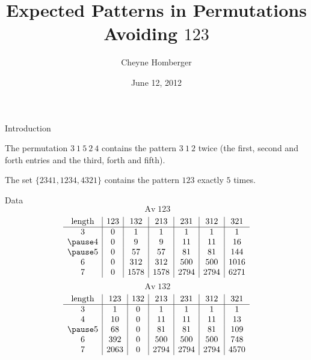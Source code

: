 \documentclass[xcolor=dvipsnames]{beamer}
\DeclareMathOperator{\Av}{Av}
\theoremstyle{definition}            %
\begin{document}
\title{Expected Patterns in Permutations Avoiding $123$}
\author{Cheyne Homberger}
\date{June 12, 2012}

\begin{frame}
  \maketitle
\end{frame}

\begin{frame}{Introduction}
  \pause 

  \begin{example}
    The permutation $3 \ 1 \ 5 \ 2 \ 4$ contains the
    pattern $3 \ 1 \ 2$ twice (the first, second and forth entries and
    the third, forth and fifth).
  \end{example}
  \pause

  \begin{example}
    The set $\{ 2341 , 1234, 4321 \} $ contains the pattern $123$
    exactly $5$ times. 
  \end{example}
\end{frame}


\begin{frame}{Data}
  \pause
  \vspace{-1pc}
  $$\Av 123 $$
  $$\begin{array}{c|c|c|c|c|c|c}
      \text{length} & 123 & 132 & 213 & 231
      & 312 & 321 \\
      \hline
      3  & 0     &    1  &    1 &    1 &    1 &    1  \\
      \pause
      4  & 0     &    9  &    9 &   11 &   11 &   16  \\
      \pause
      5  & 0     &    57 &   57 &   81 &   81 &  144  \\
      6  & 0     &   312 &  312 &  500 &  500 & 1016  \\ 
      7  & 0     &  1578 & 1578 & 2794 & 2794 & 6271   
    \end{array}
  $$
  \pause
  $$ \Av 132 $$
  $$\begin{array}{c|c|c|c|c|c|c}
      \text{length} & 123 & 132 & 213 & 231
      & 312 & 321 \\
      \hline
     3  & 1     &    0  &    1 &    1 &    1 &    1  \\
     4  & 10    &    0  &   11 &   11 &   11 &   13  \\
     \pause
     5  & 68    &    0  &   81 &   81 &   81 &  109  \\
     6  & 392   &    0  &  500 &  500 &  500 &  748  \\ 
     7  & 2063  &    0  & 2794 & 2794 & 2794 & 4570   
   \end{array}
  $$
\end{frame}
\end{document}
